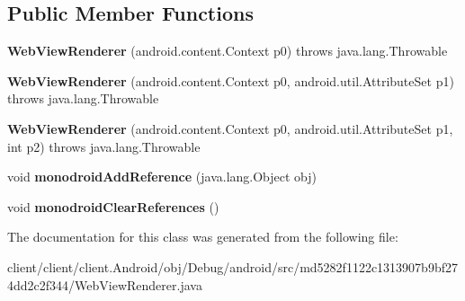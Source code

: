 \subsection*{Public Member Functions}
\begin{DoxyCompactItemize}
\item 
\hypertarget{classmd5282f1122c1313907b9bf274dd2c2f344_1_1WebViewRenderer_a11a79b26ee509f1f24e3ec115bacaec9}{}{\bfseries Web\+View\+Renderer} (android.\+content.\+Context p0)  throws java.\+lang.\+Throwable 	\label{classmd5282f1122c1313907b9bf274dd2c2f344_1_1WebViewRenderer_a11a79b26ee509f1f24e3ec115bacaec9}

\item 
\hypertarget{classmd5282f1122c1313907b9bf274dd2c2f344_1_1WebViewRenderer_ae5be62ddd58ff77cc730a20ad3617f4d}{}{\bfseries Web\+View\+Renderer} (android.\+content.\+Context p0, android.\+util.\+Attribute\+Set p1)  throws java.\+lang.\+Throwable 	\label{classmd5282f1122c1313907b9bf274dd2c2f344_1_1WebViewRenderer_ae5be62ddd58ff77cc730a20ad3617f4d}

\item 
\hypertarget{classmd5282f1122c1313907b9bf274dd2c2f344_1_1WebViewRenderer_ae10d94cd19964f3175c5a70113351541}{}{\bfseries Web\+View\+Renderer} (android.\+content.\+Context p0, android.\+util.\+Attribute\+Set p1, int p2)  throws java.\+lang.\+Throwable 	\label{classmd5282f1122c1313907b9bf274dd2c2f344_1_1WebViewRenderer_ae10d94cd19964f3175c5a70113351541}

\item 
\hypertarget{classmd5282f1122c1313907b9bf274dd2c2f344_1_1WebViewRenderer_a21092046e19dc4e3421a5b6787874290}{}void {\bfseries monodroid\+Add\+Reference} (java.\+lang.\+Object obj)\label{classmd5282f1122c1313907b9bf274dd2c2f344_1_1WebViewRenderer_a21092046e19dc4e3421a5b6787874290}

\item 
\hypertarget{classmd5282f1122c1313907b9bf274dd2c2f344_1_1WebViewRenderer_ae2fd9f73cb639157199fcaa5656a115a}{}void {\bfseries monodroid\+Clear\+References} ()\label{classmd5282f1122c1313907b9bf274dd2c2f344_1_1WebViewRenderer_ae2fd9f73cb639157199fcaa5656a115a}

\end{DoxyCompactItemize}


The documentation for this class was generated from the following file\+:\begin{DoxyCompactItemize}
\item 
client/client/client.\+Android/obj/\+Debug/android/src/md5282f1122c1313907b9bf274dd2c2f344/Web\+View\+Renderer.\+java\end{DoxyCompactItemize}

